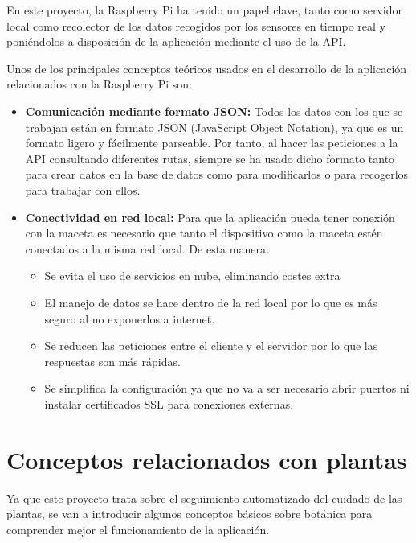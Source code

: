 En este proyecto, la Raspberry Pi ha tenido un papel clave, tanto como servidor local como recolector de los datos recogidos por los sensores en tiempo real y poniéndolos a disposición de la aplicación mediante el uso de la API.

Unos de los principales conceptos teóricos usados en el desarrollo de la aplicación relacionados con la Raspberry Pi son:

\begin{itemize}
    \item \textbf{Comunicación mediante formato JSON:} Todos los datos con los que se trabajan están en formato JSON (JavaScript Object Notation), ya que es un formato ligero y fácilmente parseable. Por tanto, al hacer las peticiones a la API consultando diferentes rutas, siempre se ha usado dicho formato tanto para crear datos en la base de datos como para modificarlos o para recogerlos para trabajar con ellos.

    \item \textbf{Conectividad en red local:} Para que la aplicación pueda tener conexión con la maceta es necesario que tanto el dispositivo como la maceta estén conectados a la misma red local. De esta manera:
    \begin{itemize}
        \item {Se evita el uso de servicios en nube, eliminando costes extra}
        \item {El manejo de datos se hace dentro de la red local por lo que es más seguro al no exponerlos a internet.}
        \item {Se reducen las peticiones entre el cliente y el servidor por lo que las respuestas son más rápidas.}
        \item {Se simplifica la configuración ya que no va a ser necesario abrir puertos ni instalar certificados SSL para conexiones externas.}
    \end{itemize}

\end{itemize}


\section{Conceptos relacionados con plantas}

Ya que este proyecto trata sobre el seguimiento automatizado del cuidado de las plantas, se van a introducir algunos conceptos básicos sobre botánica para comprender mejor el funcionamiento de la aplicación.

